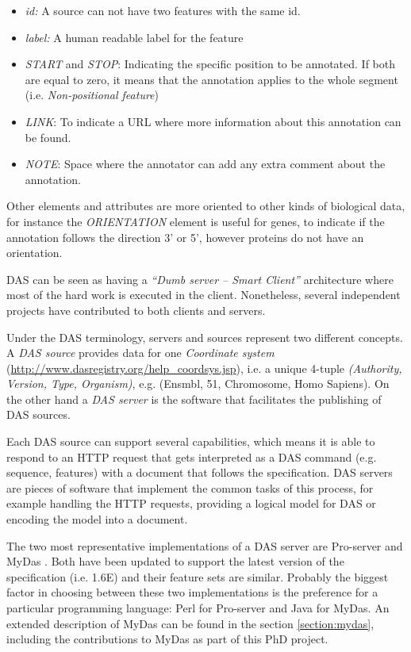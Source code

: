 \begin{itemize}
\setlength\itemsep{-0.3em}
 \item \emph{id:} A source can not have two features with the same id.
 \item \emph{label:} A human readable label for the feature
 \item \emph{START} and \emph{STOP}: Indicating the specific position to be annotated. If both are equal to zero, it means that the annotation applies to the whole segment (i.e. \emph{Non-positional feature})
 \item \emph{LINK}: To indicate a URL where more information about this annotation can be found.
 \item \emph{NOTE}: Space where the annotator can add any extra comment about the annotation.
\end{itemize}

Other elements and attributes are more oriented to other kinds of biological data, for instance the \emph{ORIENTATION} element is useful for genes, to indicate if the annotation follows the direction 3' or 5', however proteins do not have an orientation.

DAS can be seen as having a \emph{``Dumb server -- Smart Client''} architecture where most of the hard work is executed in the client. Nonetheless, several independent projects have contributed to both clients and servers. 

Under the DAS terminology, servers and sources represent two different concepts. A \emph{DAS source} provides data for one \emph{Coordinate system} (\url{http://www.dasregistry.org/help_coordsys.jsp}), i.e. a unique 4-tuple \emph{(Authority, Version, Type, Organism)}, e.g. (Ensmbl, 51, Chromosome, Homo Sapiens). On the other hand a \emph{DAS server} is the software that facilitates the publishing of DAS sources.

Each DAS source can support several capabilities, which means it is able to respond to an HTTP request that gets interpreted as a DAS command (e.g. sequence, features) with a document that follows the specification. DAS servers are pieces of software that implement the common tasks of this process, for example handling the HTTP requests, providing a logical model for DAS or encoding the model into a document.

The two most representative implementations of a DAS server are Pro-server \cite{FIN2007} and MyDas \cite{SAL2012}. Both have been updated to support the latest version of the specification (i.e. 1.6E) and their feature sets are similar. Probably the biggest factor in choosing between these two implementations is the preference for a particular programming language: Perl for Pro-server and Java for MyDas. An extended description of MyDas can be found in the section \ref{section:mydas}, including the contributions to MyDas as part of this PhD project.

